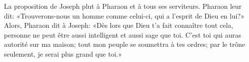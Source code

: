 La proposition de Joseph plut à Pharaon et à tous ses serviteurs.
Pharaon leur dit: «Trouverons-nous un homme comme celui-ci,
	qui a l’esprit de Dieu en lui?»
Alors, Pharaon dit à Joseph:
	«Dès lors que Dieu t’a fait connaître tout cela,
	personne ne peut être aussi intelligent et aussi sage que toi.
C’est toi qui auras autorité sur ma maison; tout mon peuple se soumettra à tes ordres;
	par le trône seulement, je serai plus grand que toi.»
